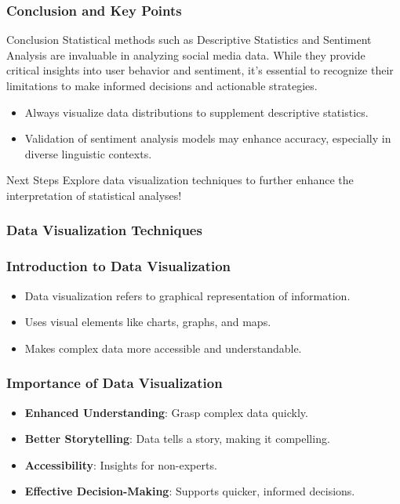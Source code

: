 \documentclass{beamer}
\begin{document}
\begin{frame}[fragile]
    \frametitle{Conclusion and Key Points}
    
    \begin{block}{Conclusion}
        Statistical methods such as Descriptive Statistics and Sentiment Analysis are invaluable in analyzing social media data. While they provide critical insights into user behavior and sentiment, it's essential to recognize their limitations to make informed decisions and actionable strategies.
    \end{block}
    
    \begin{itemize}
        \item Always visualize data distributions to supplement descriptive statistics.
        \item Validation of sentiment analysis models may enhance accuracy, especially in diverse linguistic contexts.
    \end{itemize}
    
    \begin{block}{Next Steps}
        Explore data visualization techniques to further enhance the interpretation of statistical analyses!
    \end{block}
\end{frame}

\begin{frame}[fragile]
    \frametitle{Data Visualization Techniques}
\end{frame}

\begin{frame}[fragile]
    \frametitle{Introduction to Data Visualization}
    \begin{itemize}
        \item Data visualization refers to graphical representation of information.
        \item Uses visual elements like charts, graphs, and maps.
        \item Makes complex data more accessible and understandable.
    \end{itemize}
\end{frame}

\begin{frame}[fragile]
    \frametitle{Importance of Data Visualization}
    \begin{itemize}
        \item \textbf{Enhanced Understanding}: Grasp complex data quickly.
        \item \textbf{Better Storytelling}: Data tells a story, making it compelling.
        \item \textbf{Accessibility}: Insights for non-experts.
        \item \textbf{Effective Decision-Making}: Supports quicker, informed decisions.
    \end{itemize}
\end{frame}
\end{document}
